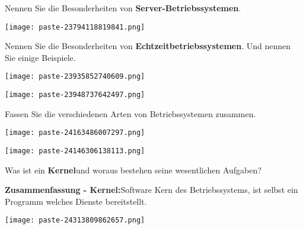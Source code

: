 \documentclass{article}
\begin{document}
\begin{tcolorbox}[colback=white!10!white,colframe=lightgray!75!black,
  savelowerto=\jobname_ex.tex,breakable,enhanced,lines before break=40]

\justifying
Nennen Sie die Besonderheiten von \textbf{Server-Betriebssystemen}.

\tcblower

\justifying
\begin{center}
\texttt{[image: paste-23794118819841.png]}
\end{center}

\end{tcolorbox}
\begin{tcolorbox}[colback=white!10!white,colframe=lightgray!75!black,
  savelowerto=\jobname_ex.tex,breakable,enhanced,lines before break=40]

\justifying
Nennen Sie die Besonderheiten von \textbf{Echtzeitbetriebssystemen}. Und nennen Sie einige Beispiele.

\tcblower

\justifying
\begin{center}
\texttt{[image: paste-23935852740609.png]}
\end{center}
\begin{center}
\texttt{[image: paste-23948737642497.png]}
\end{center}

\end{tcolorbox}
\begin{tcolorbox}[colback=white!10!white,colframe=lightgray!75!black,
  savelowerto=\jobname_ex.tex,breakable,enhanced,lines before break=40]

\justifying
Fassen Sie die verschiedenen Arten von Betriebssystemen zusammen.

\tcblower

\justifying
\begin{center}
\texttt{[image: paste-24163486007297.png]}
\end{center}
\begin{center}
\texttt{[image: paste-24146306138113.png]}
\end{center}

\end{tcolorbox}
\begin{tcolorbox}[colback=white!10!white,colframe=lightgray!75!black,
  savelowerto=\jobname_ex.tex,breakable,enhanced,lines before break=40]

\justifying
Was ist ein \textbf{Kernel}und woraus bestehen seine wesentlichen Aufgaben?

\tcblower

\justifying
\textbf{Zusammenfassung - Kernel:}Software Kern des Betriebssystems, ist selbst ein Programm welches Dienste bereitstellt.\begin{center}
\texttt{[image: paste-24313809862657.png]}
\end{center}

\end{tcolorbox}
\end{document}
